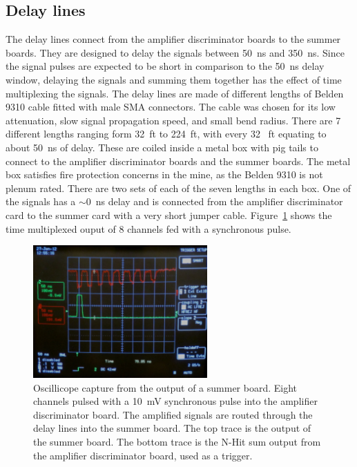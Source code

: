 \documentclass[review,number,sort&compress]{elsarticle}
\begin{document}
\subsection{Delay lines}
\label{sec:Delay}
%
The delay lines connect from the amplifier discriminator boards to the
summer boards. They are designed to delay the signals between 50~ns and 350~ns.
Since the signal pulses are expected to be short in
comparison to the 50~ns delay window, delaying the signals and summing
them together has the effect of time multiplexing the signals. The
delay lines are made of different lengths of Belden 9310 cable fitted
with male SMA connectors. The cable was chosen for its low
attenuation, slow signal propagation speed, and small bend radius.
There are 7 different lengths ranging form 32~ft to 224~ft, with every 32~ ft
equating to about 50~ns of delay. These are coiled inside a metal box
with pig tails to connect to the amplifier discriminator boards and
the summer boards. The metal box satisfies fire protection concerns
in the mine, as the Belden 9310 is not plenum rated. There are two
sets of each of the seven lengths in each box. One of the signals has
a $\sim$0~ns delay and is connected from the amplifier discriminator card to
the summer card with a very short jumper cable. Figure~\ref{fig:multipulse}
shows the time multiplexed ouput of 8 channels fed with a synchronous pulse.

\begin{figure}[ht]
\begin{center}
	\includegraphics[height=2in, keepaspectratio=true]{graphics/delaypulse.jpg}
	\caption{Oscillicope capture from the output of a summer board. Eight channels
		pulsed with a 10~mV synchronous pulse into the amplifier discriminator board. The amplified
		signals are routed through the delay lines into the summer board. The top trace is
		the output of the summer board. The bottom trace is the N-Hit sum output from the
		amplifier discriminator board, used as a trigger.
\label{fig:multipulse}}
\end{center}
\end{figure}
\end{document}
